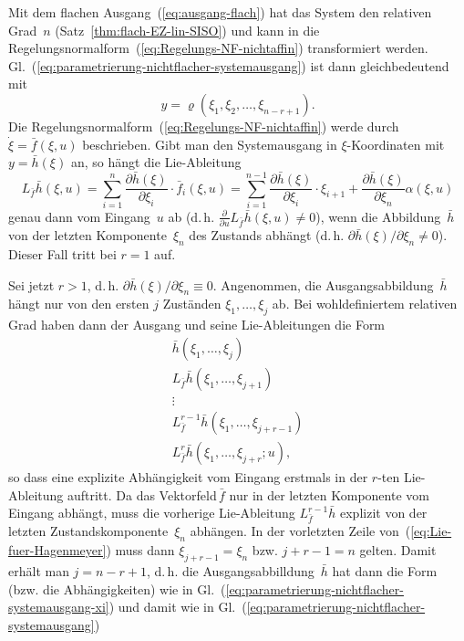 \begin{svmultproof2}
Mit dem flachen Ausgang~(\ref{eq:ausgang-flach}) hat das System
den relativen Grad~$n$ (Satz~\ref{thm:flach-EZ-lin-SISO}) und
kann in die Regelungsnormalform~(\ref{eq:Regelungs-NF-nichtaffin})
transformiert werden. Gl.~(\ref{eq:parametrierung-nichtflacher-systemausgang})
ist dann gleichbedeutend mit 
\begin{equation}
y=\varrho(\xi_{1},\xi_{2},\ldots,\xi_{n-r+1}).\label{eq:parametrierung-nichtflacher-systemausgang-xi}
\end{equation}
Die Regelungsnormalform~(\ref{eq:Regelungs-NF-nichtaffin}) werde
durch $\dot{\xi}=\bar{f}(\xi,u)$ beschrieben. Gibt man den Systemausgang
in $\xi$-Koordinaten mit $y=\bar{h}(\xi)$ an, so hängt die Lie-Ableitung
\[
L_{\bar{f}}\bar{h}(\xi,u)=\sum_{i=1}^{n}\frac{\partial\bar{h}(\xi)}{\partial\xi_{i}}\cdot\bar{f}_{i}(\xi,u)=\sum_{i=1}^{n-1}\frac{\partial\bar{h}(\xi)}{\partial\xi_{i}}\cdot\xi_{i+1}+\frac{\partial\bar{h}(\xi)}{\partial\xi_{n}}\alpha(\xi,u)
\]
genau dann vom Eingang~$u$ ab (d.\,h. $\tfrac{\partial}{\partial u}L_{\bar{f}}\bar{h}(\xi,u)\neq0$),
wenn die Abbildung~$\bar{h}$ von der letzten Komponente~$\xi_{n}$
des Zustands abhängt (d.\,h. $\partial\bar{h}(\xi)/\partial\xi_{n}\neq0$).
Dieser Fall tritt bei $r=1$ auf.

Sei jetzt $r>1$, d.\,h. $\partial\bar{h}(\xi)/\partial\xi_{n}\equiv0$.
Angenommen, die Ausgangsabbildung~$\bar{h}$ hängt nur von den ersten
$j$ Zuständen $\xi_{1},\ldots,\xi_{j}$ ab. Bei wohldefiniertem relativen
Grad haben dann der Ausgang und seine Lie-Ableitungen die Form
\begin{equation}
\begin{array}{c}
\bar{h}(\xi_{1},\ldots,\xi_{j})\\
L_{\bar{f}}\bar{h}(\xi_{1},\ldots,\xi_{j+1})\\
\vdots\\
L_{\bar{f}}^{r-1}\bar{h}(\xi_{1},\ldots,\xi_{j+r-1})\\
L_{\bar{f}}^{r}\bar{h}(\xi_{1},\ldots,\xi_{j+r};u),
\end{array}\label{eq:Lie-fuer-Hagenmeyer}
\end{equation}
so dass eine explizite Abhängigkeit vom Eingang erstmals in der $r$-ten
Lie-Ableitung auftritt. Da das Vektorfeld\,$\bar{f}$ nur in der
letzten Komponente vom Eingang abhängt, muss die vorherige Lie-Ableitung
$L_{\bar{f}}^{r-1}\bar{h}$ explizit von der letzten Zustandskomponente~$\xi_{n}$
abhängen. In der vorletzten Zeile von~(\ref{eq:Lie-fuer-Hagenmeyer})
muss dann $\xi_{j+r-1}=\xi_{n}$ bzw. $j+r-1=n$ gelten. Damit erhält
man $j=n-r+1$, d.\,h. die Ausgangsabbilldung~$\bar{h}$ hat dann
die Form (bzw. die Abhängigkeiten) wie in Gl.~(\ref{eq:parametrierung-nichtflacher-systemausgang-xi})
und damit wie in Gl.~(\ref{eq:parametrierung-nichtflacher-systemausgang})
\end{svmultproof2}


